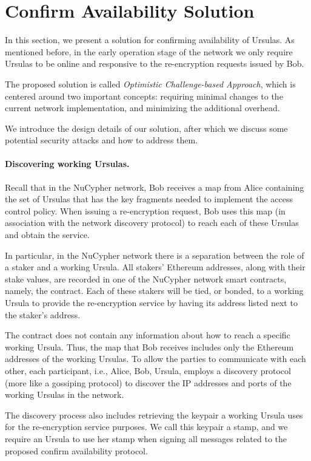 \section{Confirm Availability Solution}
\label{confirm-availability}
In this section, we present a solution for confirming availability of Ursulas. As mentioned before, in the early operation stage of the network we only require Ursulas to be online and responsive to the re-encryption 
requests issued by Bob. 


The proposed solution is called \emph{Optimistic Challenge-based Approach}, which is centered around two important concepts: requiring minimal changes to the current network implementation, and minimizing the additional overhead.

We introduce the design details of our solution, after which we discuss some potential security attacks and how to address them.


\paragraph{\bf Discovering working Ursulas.} 
Recall that in the NuCypher network, Bob receives a map from Alice containing 
the set of Ursulas that has the key fragments needed to implement the access control policy. 
When issuing a re-encryption request, Bob uses this map (in association with the network discovery protocol) to reach each of these Ursulas and obtain 
the service. 


In particular, in the NuCypher network there is a separation between the role of a staker and a working Ursula. All stakers' Ethereum addresses, along with their stake values, are recorded in one of the NuCypher network smart contracts, namely, the \stakeescrow contract. Each of these stakers will be tied, or bonded, to a working Ursula to provide the re-encryption service by having its address listed next to the staker's address. 


The \stakeescrow contract does not contain any information about how to reach a specific working Ursula. Thus, the map that Bob receives includes only the Ethereum addresses of the working Ursulas. To allow the parties to communicate with each other, each participant, i.e., Alice, Bob, Ursula, employs a discovery protocol (more like a gossiping protocol) to discover the IP addresses and ports of the working Ursulas in the network.  


The discovery process also includes retrieving the keypair a working Ursula uses for the re-encryption service purposes. We call this keypair a stamp, and we require an Ursula to use her stamp when signing all messages related to the proposed confirm availability protocol. 


